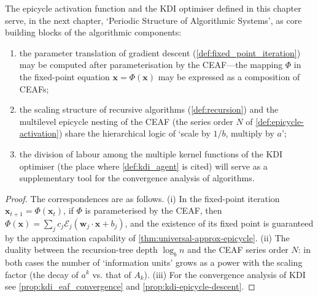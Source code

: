 \begin{proposition}\label{prop:activation_to_algorithm_transfer}
The epicycle activation function and the KDI optimiser defined in this chapter serve, in the next chapter, `Periodic Structure of Algorithmic Systems', as core building blocks of the algorithmic components:
\begin{enumerate}[label=(\roman*)]
    \item the parameter translation of gradient descent (\cref{def:fixed_point_iteration}) may be computed after parameterisation by the CEAF---the mapping $\Phi$ in the fixed-point equation $\mathbf{x} = \Phi(\mathbf{x})$ may be expressed as a composition of CEAFs;
    \item the scaling structure of recursive algorithms (\cref{def:recursion}) and the multilevel epicycle nesting of the CEAF (the series order $N$ of \cref{def:epicycle-activation}) share the hierarchical logic of `scale by $1/b$, multiply by $a$';
    \item the division of labour among the multiple kernel functions of the KDI optimiser (the place where \cref{def:kdi_agent} is cited) will serve as a supplementary tool for the convergence analysis of algorithms.
\end{enumerate}
\end{proposition}

\begin{proof}
The correspondences are as follows.
(i) In the fixed-point iteration $\mathbf{x}_{t+1}=\Phi(\mathbf{x}_t)$, if $\Phi$ is parameterised by the CEAF, then $\Phi(\mathbf{x}) = \sum_j c_j \mathcal E_j(\mathbf{w}_j \cdot \mathbf{x} + b_j)$, and the existence of its fixed point is guaranteed by the approximation capability of \cref{thm:universal-approx-epicycle}.
(ii) The duality between the recursion-tree depth $\log_b n$ and the CEAF series order $N$: in both cases the number of `information units' grows as a power with the scaling factor (the decay of $a^k$ vs. that of $A_k$).
(iii) For the convergence analysis of KDI see \cref{prop:kdi_eaf_convergence} and \cref{prop:kdi-epicycle-descent}.
\end{proof}

